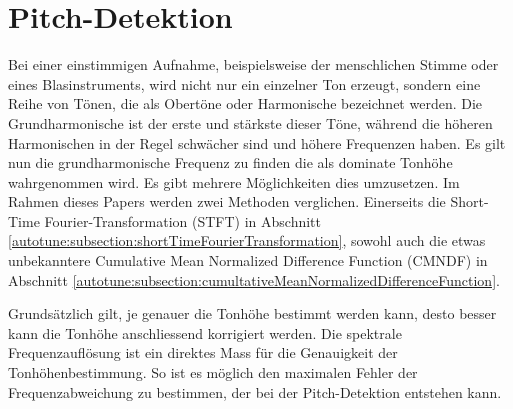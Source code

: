 %
%
%
%
\section{Pitch-Detektion
\label{autotune:section:pitchDetektion}}
Bei einer einstimmigen Aufnahme, beispielsweise der menschlichen Stimme oder eines Blasinstruments,
wird nicht nur ein einzelner Ton erzeugt, sondern eine Reihe von Tönen, die als Obertöne oder Harmonische bezeichnet werden.
Die Grundharmonische ist der erste und stärkste dieser Töne, während die höheren Harmonischen in der Regel schwächer sind und höhere Frequenzen haben.
Es gilt nun die grundharmonische Frequenz zu finden die als dominate Tonhöhe wahrgenommen wird.
Es gibt mehrere Möglichkeiten dies umzusetzen.
Im Rahmen dieses Papers werden zwei Methoden verglichen.
Einerseits die Short-Time Fourier-Transformation (STFT) in Abschnitt \ref{autotune:subsection:shortTimeFourierTransformation},
sowohl auch die etwas unbekanntere Cumulative Mean Normalized Difference Function (CMNDF) in Abschnitt \ref{autotune:subsection:cumultativeMeanNormalizedDifferenceFunction}.

Grundsätzlich gilt, je genauer die Tonhöhe bestimmt werden kann, desto besser kann die Tonhöhe anschliessend korrigiert werden.
Die spektrale Frequenzauflösung ist ein direktes Mass für die Genauigkeit der Tonhöhenbestimmung.
So ist es möglich den maximalen Fehler der Frequenzabweichung zu bestimmen, der bei der Pitch-Detektion entstehen kann.

